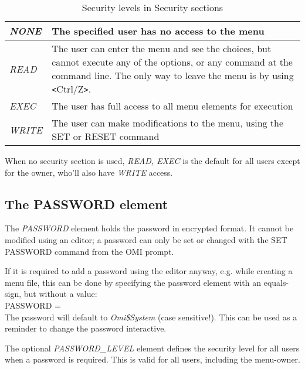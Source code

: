 \documentclass[a4paper]{book}
\newcommand{\vs}{\vspace{3mm}}
\newcommand{\lt}{\texttt{<}}
\newcommand{\gt}{\texttt{>}}
\renewcommand{\indent}{\hspace*{5mm}}
\begin{document}
\begin{table}[h!tb]
\begin{minipage}[h!tb]{\textwidth}
\begin{tabular}{lp{9cm}} \hline
\textsl{NONE} & The specified user has no access to the menu \\ \hline
\textsl{READ} & The user can enter the menu and see the choices, but cannot execute any of the options, or any command at the command line. The only way to leave the menu is by using \lt Ctrl/Z\gt . \\ \hline
\textsl{EXEC} &  The user has full access to all menu elements for execution \\ \hline
\textsl{WRITE} & The user can make modifications to the menu, using the \textsf{SET} or \textsf{RESET} command \\ \hline
\end{tabular}
\caption{Security levels in Security sections}\label{tab:seclevels}
\end{minipage}
\end{table}

When no security section is used, \textsl{READ, EXEC} is the default for all 
users except for the owner, who'll also have \textsl{WRITE} access.

\subsection{The PASSWORD element}
\label{subsubsec:mylabel33}

The \textsl{PASSWORD} element holds 
the password in encrypted format. It cannot be modified using an editor; a 
password can only be set or changed with the \textsf{SET PASSWORD} command from the OMI prompt.

\vs

If it is required to add a password using the editor anyway, e.g. while 
creating a menu file, this can be done by specifying the password element 
with an equals-sign, but without a value: \\
\indent\textsf{PASSWORD =}\\
The password will default to \textsl{Omi{\$}System} (case sensitive!). This can be 
used as a reminder to change the password interactive.

\vs

The optional \textsl{PASSWORD{\_}LEVEL} element defines the security level for all 
users when a password is required. This is valid for all users, including 
the menu-owner.
\end{document}
